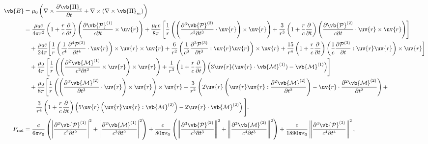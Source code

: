 \begin{align*}
	\vb{B} &= \mu_0 \left( \nabla \times \frac{\partial \vb{\Pi}_e}{\partial t} + \nabla \times (\nabla \times \vb{\Pi}_m) \right) \\
	&= \frac{\mu_0 c}{4\pi r^2} \left( 1 + \frac{r}{c} \frac{\partial}{\partial t} \right) \left( \frac{\partial \vb{\mathcal{P}}^{(1)}}{c \partial t} \times \uv{r} \right) + \frac{\mu_0 c}{8\pi} \left[ \frac{1}{r} \left( \left( \frac{\partial^3 \vb{\mathcal{P}}^{(2)}}{c^3 \partial t^3} \cdot \uv{r} \right) \times \uv{r} \right) + \frac{3}{r^3} \left( 1 + \frac{r}{c} \frac{\partial}{\partial t} \right) \left( \frac{\partial \vb{\mathcal{P}}^{(2)}}{c \partial t} \cdot \uv{r} \times \uv{r} \right) \right] \\
	&\quad+\dfrac{\mu_0 c}{24\pi} \bigg[
		\dfrac{1}{r} \left( \dfrac{1}{c^4} \dfrac{\partial^4 \mathcal{P}^{(3)}}{\partial t^4} \cdot \uv{r} \right) \times \uv{r} \times \uv{r} +
		\dfrac{6}{r^2} \left( \dfrac{1}{c^3} \dfrac{\partial^3 \mathcal{P}^{(3)}}{\partial t^3} : \uv{r} \uv{r} \right) \times \uv{r} +
		\dfrac{15}{r^4} \left( 1 + \dfrac{r}{c} \dfrac{\partial}{\partial t} \right) \left( \dfrac{1}{c} \dfrac{\partial \mathcal{P}^{(3)}}{\partial t} : \uv{r} \uv{r} \right) \times \uv{r}
		\bigg]
	\\
	&\quad + \frac{\mu_0}{4\pi} \left[ \frac{1}{r} \left( \left( \frac{\partial^2 \vb{\mathcal{M}}^{(1)}}{c^2 \partial t^2} \times \uv{r} \right) \times \uv{r} \right) + \frac{1}{r^3} \left( 1 + \frac{r}{c} \frac{\partial}{\partial t} \right) \left( 3 \uv{r} (\uv{r} \cdot \vb{\mathcal{M}}^{(1)}) - \vb{\mathcal{M}}^{(1)} \right) \right] \\
	&\quad + \frac{\mu_0}{8\pi} \Bigg[ \frac{1}{r} \left( \left( \frac{\partial^3 \vb{\mathcal{M}}^{(2)}}{\partial t^3} \cdot \uv{r} \right) \times \uv{r} \right) \times \uv{r} + \frac{3}{r^2} \left( 2 \uv{r} \left( \uv{r} \uv{r} : \frac{\partial^2 \vb{\mathcal{M}}^{(2)}}{\partial t^2} \right) - \uv{r} \cdot \frac{\partial^2 \vb{\mathcal{M}}^{(2)}}{\partial t^2} \right) + \\&\qquad\frac{3}{r^4} \left( 1 + \frac{r}{c} \frac{\partial}{\partial t} \right) \left( 5 \uv{r} \left( \uv{r} \uv{r} : \vb{\mathcal{M}}^{(2)} \right) - 2 \uv{r} \cdot \vb{\mathcal{M}}^{(2)} \right) \Bigg].\\
	P_{\text{rad}} &= \frac{c}{6\pi \varepsilon_0} \left( \left| \frac{\partial^2 \vb{\mathcal{P}}^{(1)}}{c^2 \partial t^2} \right|^2 + \left| \frac{\partial^2 \vb{\mathcal{M}}^{(1)}}{c^3 \partial t^2} \right|^2 \right) + \frac{c}{80\pi \varepsilon_0} \left( \left\| \frac{\partial^3 \vb{\mathcal{P}}^{(2)}}{c^3 \partial t^3} \right\|^2 + \left\| \frac{\partial^3 \vb{\mathcal{M}}^{(2)}}{c^4 \partial t^3} \right\|^2 \right) + \frac{c}{1890\pi \varepsilon_0} \left\| \frac{\partial^4 \vb{\mathcal{P}}^{(3)}}{c^4 \partial t^4} \right\|^2, \\

\end{align*}
